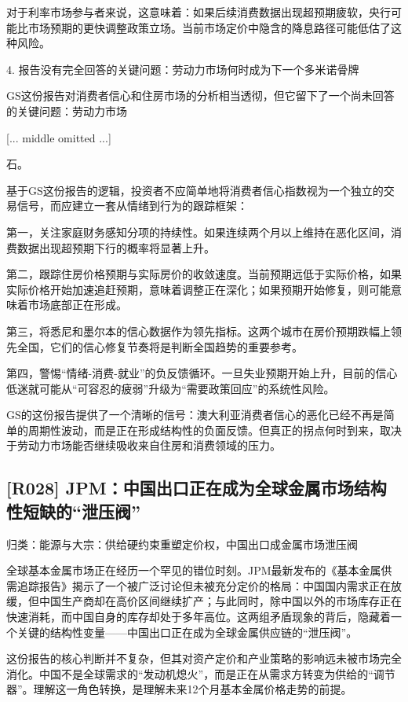 \documentclass[11pt]{ctexart}
\begin{document}
对于利率市场参与者来说，这意味着：如果后续消费数据出现超预期疲软，央行可能比市场预期的更快调整政策立场。当前市场定价中隐含的降息路径可能低估了这种风险。

4. 报告没有完全回答的关键问题：劳动力市场何时成为下一个多米诺骨牌

GS这份报告对消费者信心和住房市场的分析相当透彻，但它留下了一个尚未回答的关键问题：劳动力市场

[... middle omitted ...]

石。

基于GS这份报告的逻辑，投资者不应简单地将消费者信心指数视为一个独立的交易信号，而应建立一套从情绪到行为的跟踪框架：

第一，关注家庭财务感知分项的持续性。如果连续两个月以上维持在恶化区间，消费数据出现超预期下行的概率将显著上升。

第二，跟踪住房价格预期与实际房价的收敛速度。当前预期远低于实际价格，如果实际价格开始加速追赶预期，意味着调整正在深化；如果预期开始修复，则可能意味着市场底部正在形成。

第三，将悉尼和墨尔本的信心数据作为领先指标。这两个城市在房价预期跌幅上领先全国，它们的信心修复节奏将是判断全国趋势的重要参考。

第四，警惕“情绪-消费-就业”的负反馈循环。一旦失业预期开始上升，目前的信心低迷就可能从“可容忍的疲弱”升级为“需要政策回应”的系统性风险。

GS的这份报告提供了一个清晰的信号：澳大利亚消费者信心的恶化已经不再是简单的周期性波动，而是正在形成结构性的负面反馈。但真正的拐点何时到来，取决于劳动力市场能否继续吸收来自住房和消费领域的压力。

\subsection{[R028] JPM：中国出口正在成为全球金属市场结构性短缺的“泄压阀”}
{\small\color{refgray}归类：能源与大宗：供给硬约束重塑定价权，中国出口成金属市场泄压阀}

全球基本金属市场正在经历一个罕见的错位时刻。JPM最新发布的《基本金属供需追踪报告》揭示了一个被广泛讨论但未被充分定价的格局：中国国内需求正在放缓，但中国生产商却在高价区间继续扩产；与此同时，除中国以外的市场库存正在快速消耗，而中国自身的库存却处于多年高位。这两组矛盾现象的背后，隐藏着一个关键的结构性变量——中国出口正在成为全球金属供应链的“泄压阀”。

这份报告的核心判断并不复杂，但其对资产定价和产业策略的影响远未被市场完全消化。中国不是全球需求的“发动机熄火”，而是正在从需求方转变为供给的“调节器”。理解这一角色转换，是理解未来12个月基本金属价格走势的前提。
\end{document}
